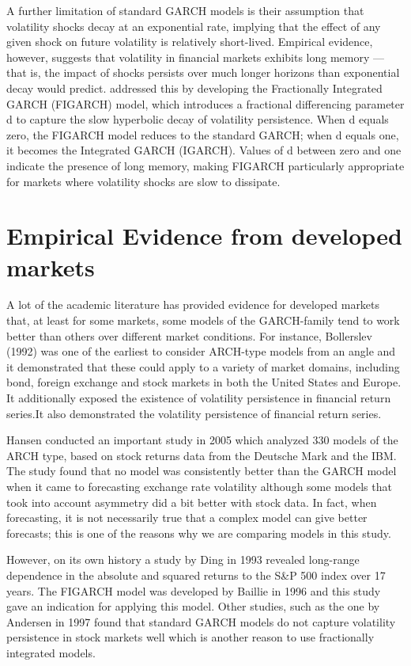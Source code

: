 A further limitation of standard GARCH models is their assumption that volatility shocks decay at an exponential rate, implying that the effect of any given shock on future volatility is relatively short-lived. Empirical evidence, however, suggests that volatility in financial markets exhibits long memory — that is, the impact of shocks persists over much longer horizons than exponential decay would predict.\cite{baillie1996} addressed this by developing the Fractionally Integrated GARCH (FIGARCH) model, which introduces a fractional differencing parameter d to capture the slow hyperbolic decay of volatility persistence. When d equals zero, the FIGARCH model reduces to the standard GARCH; when d equals one, it becomes the Integrated GARCH (IGARCH). Values of d between zero and one indicate the presence of long memory, making FIGARCH particularly appropriate for markets where volatility shocks are slow to dissipate.



\section{Empirical Evidence from developed markets}

A lot of the academic literature has provided evidence for developed markets that, at least for some markets, some models of the GARCH-family tend to work better than others over different market conditions. For instance, Bollerslev (1992) was one of the earliest to consider ARCH-type models from an angle and it demonstrated that these could apply to a variety of market domains, including bond, foreign exchange and stock markets in both the United States and Europe. It additionally exposed the existence of volatility persistence in financial return series.It also demonstrated the volatility persistence of financial return series.

Hansen conducted an important study in 2005 which analyzed 330 models of the ARCH type, based on stock returns data from the Deutsche Mark and the IBM. The study found that no model was consistently better than the GARCH model when it came to forecasting exchange rate volatility although some models that took into account asymmetry did a bit better with stock data. In fact, when forecasting, it is not necessarily true that a complex model can give better forecasts; this is one of the reasons why we are comparing models in this study.

However, on its own history a study by Ding in 1993 revealed long-range dependence in the absolute and squared returns to the S\&P 500 index over 17 years. The FIGARCH model was developed by Baillie in 1996 and this study gave an indication for applying this model. Other studies, such as the one by Andersen in 1997 found that standard GARCH models do not capture volatility persistence in stock markets well which is another reason to use fractionally integrated models.

